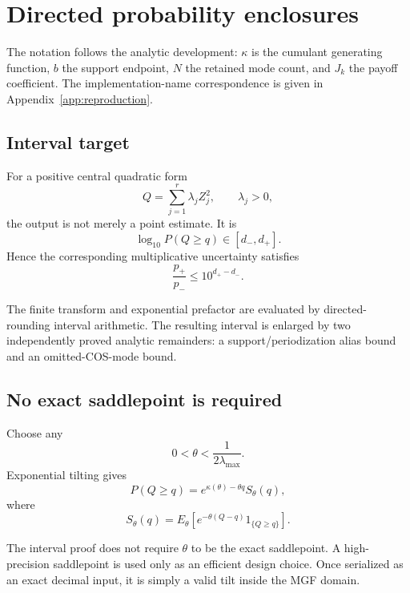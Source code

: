 \chapter{Directed probability enclosures}\label{ch:intervals}

\label{sec:final-4}


The notation follows the analytic development: $\kappa$ is the cumulant generating function, $b$ the support endpoint, $N$ the retained mode count, and $J_k$ the payoff coefficient. The implementation-name correspondence is given in Appendix~\ref{app:reproduction}.

\section{Interval target}

For a positive central quadratic form
\[
Q=\sum_{j=1}^{r}\lambda_jZ_j^2,
\qquad
\lambda_j>0,
\]
the output is not merely a point estimate.  It is
\[
\boxed{
\log_{10}P(Q\ge q)\in[d_-,d_+].
}
\]
Hence the corresponding multiplicative uncertainty satisfies
\[
\boxed{
\frac{p_+}{p_-}\le 10^{d_+-d_-}.
}
\]

The finite transform and exponential prefactor are evaluated by
directed-rounding interval arithmetic.  The resulting interval is enlarged by
two independently proved analytic remainders: a support/periodization alias
bound and an omitted-COS-mode bound.

\section{No exact saddlepoint is required}

Choose any
\[
0<\theta<\frac{1}{2\lambda_{\max}}.
\]
Exponential tilting gives
\[
P(Q\ge q)
=
e^{\kappa(\theta)-\theta q}
S_\theta(q),
\]
where
\[
S_\theta(q)
=
E_\theta\!\left[
e^{-\theta(Q-q)}
1_{\{Q\ge q\}}
\right].
\]

The interval proof does not require \(\theta\) to be the exact saddlepoint.
A high-precision saddlepoint is used only as an efficient design choice.
Once serialized as an exact decimal input, it is simply a valid tilt inside
the MGF domain.

